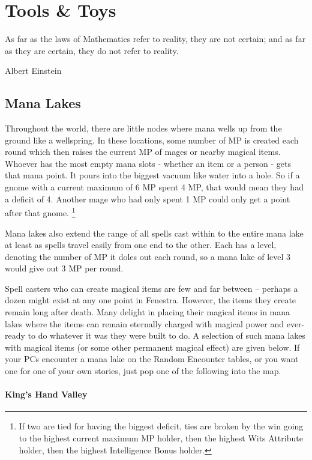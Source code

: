 \chapter{Tools \& Toys}

\epigraph{As far as the laws of Mathematics refer to reality, they are not certain; and as far as they are certain, they do not refer to reality.}{Albert Einstein}


\section{Mana Lakes}\label{mana_lake}

\begin{multicols}{2}

Throughout the world, there are little nodes where mana wells up from the ground like a wellspring.  In these locations, some number of MP is created each round which then raises the current MP of mages or nearby magical items.  Whoever has the most empty mana slots - whether an item or a person - gets that mana point.  It pours into the biggest vacuum like water into a hole.  So if a gnome with a current maximum of 6 MP spent 4 MP, that would mean they had a deficit of 4.  Another mage who had only spent 1 MP could only get a point after that gnome. 
\footnote{If two are tied for having the biggest deficit, ties are broken by the win going to the highest current maximum MP holder, then the highest Wits Attribute holder, then the highest Intelligence Bonus holder.}

Mana lakes also extend the range of all spells cast within to the entire mana lake at least as spells travel easily from one end to the other.  Each has a level, denoting the number of MP it doles out each round, so a mana lake of level 3 would give out 3 MP per round.

Spell casters who can create magical items are few and far between -- perhaps a dozen might exist at any one point in Fenestra.  However, the items they create remain long after death.  Many delight in placing their magical items in mana lakes where the items can remain eternally charged with magical power and ever-ready to do whatever it was they were built to do.  A selection of such mana lakes with magical items (or some other permanent magical effect) are given below.  If your PCs encounter a mana lake on the Random Encounter tables, or you want one for one of your own stories, just pop one of the following into the map.

\subsubsection{King's Hand Valley}


\end{multicols}
